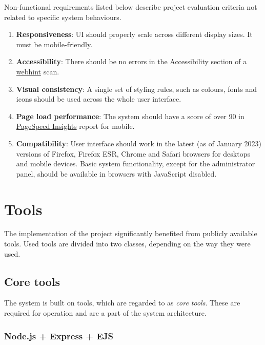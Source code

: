 Non-functional requirements listed below describe project evaluation criteria not related to specific system behaviours.

\begin{enumerate}
	\item \textbf{Responsiveness}: UI should properly scale across different display sizes. It must be mobile-friendly.

	\item \textbf{Accessibility}: There should be no errors in the Accessibility section of a \href{https://webhint.io/}{webhint} scan.

	\item \textbf{Visual consistency}: A single set of styling rules, such as colours, fonts and icons should be used across the whole user interface.

	\item \textbf{Page load performance}: The system should have a score of over 90 in \href{https://pagespeed.web.dev}{PageSpeed Insights} report for mobile.

	\item \textbf{Compatibility}: User interface should work in the latest (as of January 2023) versions of Firefox, Firefox ESR, Chrome and Safari browsers for desktops and mobile devices. Basic system functionality, except for the administrator panel, should be available in browsers with JavaScript disabled.
\end{enumerate}

\section{Tools}

The implementation of the project significantly benefited from publicly available tools. Used tools are divided into two classes, depending on the way they were used.

\subsection{Core tools}

The system is built on tools, which are regarded to as \textit{core tools}. These are required for operation and are a part of the system architecture.

\subsubsection{Node.js + Express + EJS}

